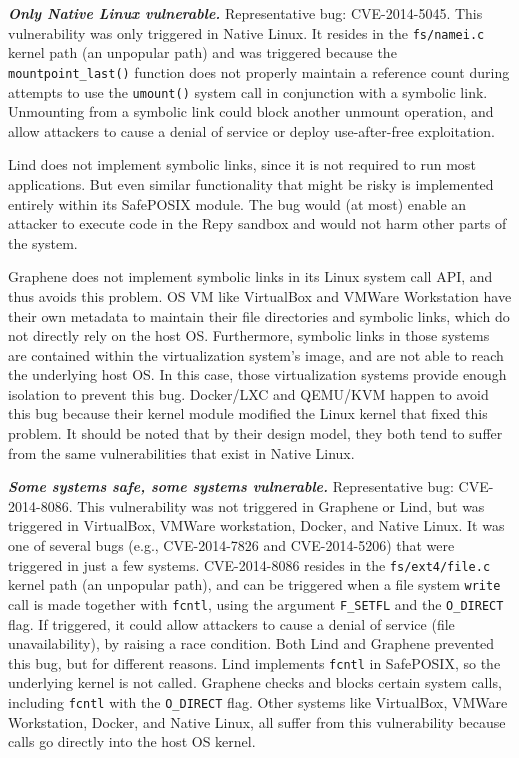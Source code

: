 {{{\emph{\textbf{Only Native Linux vulnerable.}}  Representative bug: CVE-2014-5045.
This vulnerability was only triggered in Native Linux. It resides in the
\texttt{fs/namei.c} kernel path (an unpopular path) and was triggered because
the \texttt{mountpoint\_last()}
function does not properly
maintain a reference count during attempts to use the \texttt{umount()} system call
in conjunction with a symbolic link. Unmounting from a symbolic link could block
another unmount operation, and allow attackers to cause a denial of service or
deploy use-after-free exploitation.

Lind does not implement symbolic links, since it is not required to run most applications. 
But even similar functionality that might be risky is implemented entirely
within its SafePOSIX module. The bug would (at most) enable an attacker to execute
code in the Repy sandbox and would not harm other parts of the system.

Graphene does not implement symbolic links in its Linux system call API, and thus avoids
this problem.
OS VM like VirtualBox and VMWare Workstation have their own metadata to maintain their file
directories and symbolic links, which do not directly rely on the host OS.
Furthermore, symbolic links in those systems are contained within the virtualization system's image,
and are not able to reach the underlying host OS. In this case, those virtualization systems provide enough
isolation to prevent this bug.
Docker/LXC and QEMU/KVM happen to avoid this bug because their kernel module modified the Linux kernel
that fixed this problem. It should be noted that by their design model, they both tend to suffer from
the same vulnerabilities that exist in Native Linux.

\emph{\textbf{Some systems safe, some systems vulnerable.}}  Representative bug: CVE-2014-8086.
This vulnerability was not triggered in Graphene or Lind, but was triggered in
VirtualBox, VMWare workstation, Docker, and Native Linux. It was one of several
bugs (e.g., CVE-2014-7826 and CVE-2014-5206) that were triggered in just a few systems.
CVE-2014-8086 resides in the \texttt{fs/ext4/file.c} kernel path (an unpopular path), and can be
triggered when a file system \texttt{write}
call is made together with \texttt{fcntl},
using the argument \texttt{F\_SETFL} and the \texttt{O\_DIRECT} flag. If triggered, it could
allow attackers to cause a denial of service (file unavailability), by raising a race condition.
Both Lind and Graphene prevented this bug, but for different reasons. Lind
implements \texttt{fcntl} in SafePOSIX, so the underlying kernel is not called.
Graphene checks and blocks certain system calls, including
\texttt{fcntl} with the \texttt{O\_DIRECT} flag.
Other systems like VirtualBox, VMWare Workstation, Docker, and Native Linux,
all suffer from this vulnerability because calls go directly into the host OS
kernel.

}}}
